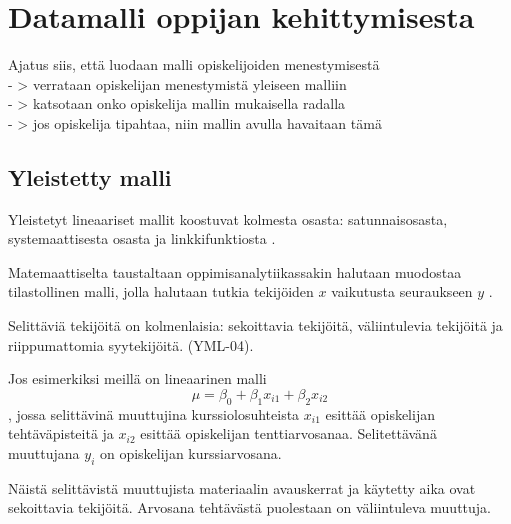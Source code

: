 \chapter{Datamalli oppijan kehittymisesta\label{datamallioppijankehittymisesta}}
\color{red}






Ajatus siis, että luodaan malli opiskelijoiden menestymisestä \\
- > verrataan opiskelijan menestymistä yleiseen malliin \\
- > katsotaan onko opiskelija mallin mukaisella radalla \\
- > jos opiskelija tipahtaa, niin mallin avulla havaitaan tämä

\section{Yleistetty malli} %
Yleistetyt lineaariset mallit koostuvat kolmesta osasta: satunnaisosasta, systemaattisesta osasta ja linkkifunktiosta \cite{agrestiFoundationsLinearGeneralized2015}.

Matemaattiselta taustaltaan oppimisanalytiikassakin halutaan muodostaa tilastollinen malli, jolla halutaan tutkia tekijöiden $x$ vaikutusta seuraukseen $y$ \cite{mottonenYleistetytLineaarisetMallit2021}. 



Selittäviä tekijöitä on kolmenlaisia: sekoittavia tekijöitä, väliintulevia tekijöitä ja riippumattomia syytekijöitä. \cite{mottonenYleistetytLineaarisetMallit2021} (YML-04).

Jos esimerkiksi meillä on lineaarinen malli $$\mu = \beta_0 + \beta_1x_{i1} + \beta_2x_{i2}$$, jossa selittävinä muuttujina kurssiolosuhteista $x_{i1}$ esittää opiskelijan tehtäväpisteitä ja $x_{i2}$ esittää opiskelijan tenttiarvosanaa. Selitettävänä muuttujana $y_i$ on opiskelijan kurssiarvosana. 

Näistä selittävistä muuttujista materiaalin avauskerrat ja käytetty aika ovat sekoittavia tekijöitä. Arvosana tehtävästä puolestaan on väliintuleva muuttuja.


